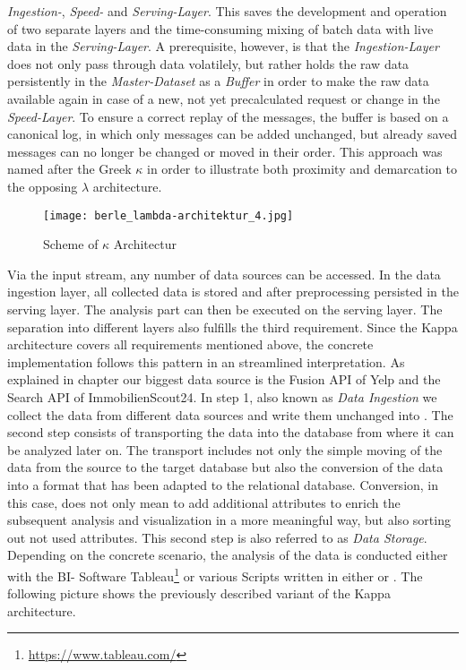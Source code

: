 \textit{Ingestion-}, \textit{Speed-} and \textit{Serving-Layer}.
This saves the development and operation of two separate layers and the time-consuming mixing of batch data with live data in the \textit{Serving-Layer}.
A prerequisite, however, is that the \textit{Ingestion-Layer} does not only pass through data volatilely,
but rather holds the raw data persistently in the \textit{Master-Dataset} as a \textit{Buffer} in order to make the raw data available again in case of a new,
not yet precalculated request or change in the \textit{Speed-Layer}.
To ensure a correct replay of the messages, the buffer is based on a canonical log, in which only messages can be added unchanged, but already saved messages can no
longer be changed or moved in their order.
This approach was named after the Greek $\kappa$ in order to illustrate both proximity and demarcation to the opposing $\lambda$ architecture.
\cite{Kappa} \cite{Kappa2}
\begin{figure}[h]
	\centering
	\texttt{[image: berle\_lambda-architektur\_4.jpg]}
	\caption[Scheme of $\kappa$ Architectur]{Scheme of $\kappa$ Architectur\cite{jaxkappa}}
	\label{fig:KappaArchitecture}
\end{figure}
Via the input stream, any number of data sources can be accessed. In the
data ingestion layer, all collected data is stored and after preprocessing persisted in the serving layer. %
The analysis part can then be executed on the serving layer.
The separation into different layers also fulfills the third requirement. Since the Kappa architecture covers all requirements mentioned above, the concrete implementation follows this pattern in an streamlined interpretation.
\newline
As explained in chapter  our biggest data source is the Fusion \ac{API} of Yelp and
the Search \ac{API} of ImmobilienScout24. %
\newline
In step 1, also known as \textit{Data Ingestion} we collect the data from different data sources and write them unchanged into \gds{}.
The second step consists of transporting the data into the \pg{} database from where it can be analyzed later on.
The transport includes not only the simple moving of the data from the source to the target database but also the conversion of the data
into a format that has been adapted to the relational database.
Conversion, in this case, does not only mean to add additional attributes to enrich the subsequent analysis and visualization in a more meaningful way,
but also sorting out not used attributes. This second step is also referred to as \textit{Data Storage}.
Depending on the concrete scenario, the analysis of the data is conducted either with the BI- Software Tableau\footnote{\url{https://www.tableau.com/}} or various Scripts written in either  or .
\newline
The following picture shows the previously described variant of the Kappa architecture.
